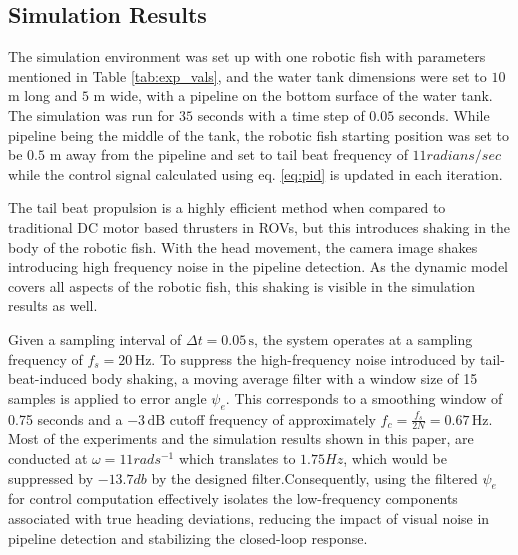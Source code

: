 \documentclass[pdflatex,sn-mathphys-num]{sn-jnl}
\theoremstyle{thmstyleone}%
\begin{document}
\subsection{Simulation Results}
\par The simulation environment was set up with one robotic fish with parameters mentioned in Table \ref{tab:exp_vals}, and the water tank dimensions were set to $10$ m long and $5$ m wide, with a pipeline on the bottom surface of the water tank. The simulation was run for $35$ seconds with a time step of $0.05$ seconds. While pipeline being the middle of the tank, the robotic fish starting position was set to be $0.5$ m away from the pipeline and set to tail beat frequency of $11 radians/sec$ while the control signal calculated using eq. \ref{eq:pid} is updated in each iteration.
\par The tail beat propulsion is a highly efficient method when compared to traditional DC motor based thrusters in ROVs, but this introduces shaking in the body of the robotic fish. With the head movement, the camera image shakes introducing high frequency noise in the pipeline detection. As the dynamic model covers all aspects of the robotic fish, this shaking is visible in the simulation results as well. 
\par Given a sampling interval of \( \Delta t = 0.05\,\text{s} \), the system operates at a sampling frequency of \( f_s = 20\,\text{Hz} \). To suppress the high-frequency noise introduced by tail-beat-induced body shaking, a moving average filter with a window size of 15 samples is applied to error angle \( \psi_e \). This corresponds to a smoothing window of 0.75 seconds and a \(-3\,\text{dB}\) cutoff frequency of approximately \( f_c = \frac{f_s}{2N} = 0.67\,\text{Hz} \). Most of the experiments and the simulation results shown in this paper, are conducted at $\omega = 11 rads^{-1}$ which translates to $1.75 Hz$, which would be suppressed by $-13.7db$ by the designed filter.Consequently, using the filtered \( \psi_e \) for control computation effectively isolates the low-frequency components associated with true heading deviations, reducing the impact of visual noise in pipeline detection and stabilizing the closed-loop response.
\end{document}
